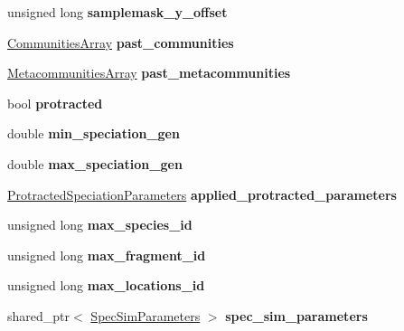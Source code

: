 \begin{DoxyCompactItemize}
\item 
unsigned long {\bfseries samplemask\+\_\+y\+\_\+offset}\hypertarget{class_community_aeaebe975a46d62b70380e50ff7ebd09a}{}\label{class_community_aeaebe975a46d62b70380e50ff7ebd09a}

\item 
\hyperlink{struct_communities_array}{Communities\+Array} {\bfseries past\+\_\+communities}\hypertarget{class_community_a0726a962287af565658aaa8f9d9ea6c1}{}\label{class_community_a0726a962287af565658aaa8f9d9ea6c1}

\item 
\hyperlink{struct_metacommunities_array}{Metacommunities\+Array} {\bfseries past\+\_\+metacommunities}\hypertarget{class_community_ae00d8d9f52d163b040cc716955569ad3}{}\label{class_community_ae00d8d9f52d163b040cc716955569ad3}

\item 
bool {\bfseries protracted}\hypertarget{class_community_acab5a676e365934f9dfd2148ab9d5a60}{}\label{class_community_acab5a676e365934f9dfd2148ab9d5a60}

\item 
double {\bfseries min\+\_\+speciation\+\_\+gen}\hypertarget{class_community_a6b906ec2096b22631b60aa3511925fe0}{}\label{class_community_a6b906ec2096b22631b60aa3511925fe0}

\item 
double {\bfseries max\+\_\+speciation\+\_\+gen}\hypertarget{class_community_aeff6623b51fdd177e87b6eebfba27080}{}\label{class_community_aeff6623b51fdd177e87b6eebfba27080}

\item 
\hyperlink{struct_protracted_speciation_parameters}{Protracted\+Speciation\+Parameters} {\bfseries applied\+\_\+protracted\+\_\+parameters}\hypertarget{class_community_a28b02e78e3453599b678072b57a5ebf7}{}\label{class_community_a28b02e78e3453599b678072b57a5ebf7}

\item 
unsigned long {\bfseries max\+\_\+species\+\_\+id}\hypertarget{class_community_a31f80e452a92aabdf2d9ba7bcc798f84}{}\label{class_community_a31f80e452a92aabdf2d9ba7bcc798f84}

\item 
unsigned long {\bfseries max\+\_\+fragment\+\_\+id}\hypertarget{class_community_a5de3afc536570241b82489d1b9c87d03}{}\label{class_community_a5de3afc536570241b82489d1b9c87d03}

\item 
unsigned long {\bfseries max\+\_\+locations\+\_\+id}\hypertarget{class_community_ae503af91bc33ed302a363098a3b49a61}{}\label{class_community_ae503af91bc33ed302a363098a3b49a61}

\item 
shared\+\_\+ptr$<$ \hyperlink{struct_spec_sim_parameters}{Spec\+Sim\+Parameters} $>$ {\bfseries spec\+\_\+sim\+\_\+parameters}\hypertarget{class_community_abf3fc9e0c7de564b4b616e4c158f31d2}{}\label{class_community_abf3fc9e0c7de564b4b616e4c158f31d2}

\end{DoxyCompactItemize}


